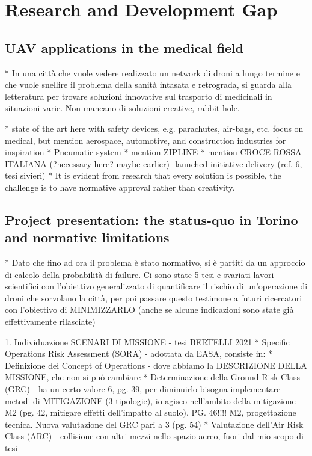 \chapter{Research and Development Gap}
\label{chapter:research-gap}






\section{UAV applications in the medical field}
 



* In una città che vuole vedere realizzato un network di droni a lungo termine e che vuole snellire il problema della sanità intasata e retrograda, si guarda alla letteratura per trovare soluzioni innovative sul trasporto di medicinali in situazioni varie. Non mancano di soluzioni creative, rabbit hole. 



* state of the art here with safety devices, e.g. parachutes, air-bags, etc. focus on medical, but mention aerospace, automotive, and construction industries for inspiration
* Pneumatic system
* mention ZIPLINE
* mention CROCE ROSSA ITALIANA (?necessary here? maybe earlier)- launched initiative delivery (ref. 6, tesi sivieri)
* It is evident from research that every solution is possible, the challenge is to have normative approval rather than creativity. 



\section{Project presentation: the status-quo in Torino and normative limitations}
* Dato che fino ad ora il problema è stato normativo, si è partiti da un approccio di calcolo della probabilità di failure. Ci sono state 5 tesi e svariati lavori scientifici con l'obiettivo generalizzato di quantificare il rischio di un'operazione di droni che sorvolano la città, per poi passare questo testimone a futuri ricercatori con l'obiettivo di MINIMIZZARLO (anche se alcune indicazioni sono state già effettivamente rilasciate)




1. Individuazione SCENARI DI MISSIONE - tesi BERTELLI 2021
* Specific Operations Risk Assessment (SORA) - adottata da EASA, consiste in:
    * Definizione dei Concept of Operations - dove abbiamo la DESCRIZIONE DELLA MISSIONE, che non si può cambiare
    * Determinazione della Ground Risk Class (GRC) - ha un certo valore 6, pg. 39, per diminuirlo bisogna implementare metodi di MITIGAZIONE (3 tipologie), io agisco nell'ambito della mitigazione M2 (pg. 42, mitigare effetti dell'impatto al suolo). PG. 46!!!! M2, progettazione tecnica. Nuova valutazione del GRC pari a 3 (pg. 54)
    * Valutazione dell’Air Risk Class (ARC) - collisione con altri mezzi nello spazio aereo, fuori dal mio scopo di tesi


